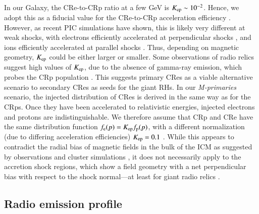 \documentclass[fleqn,usenatbib,useAMS]{mnras}
\begin{document}
In our Galaxy, the CRe-to-CRp ratio at a few GeV is $K_{{\mathrm{ep}}} \sim
10^{-2}$. Hence, we adopt this as a fiducial value for the CRe-to-CRp
acceleration efficiency \citep[see][for more
  discussion]{pinzke13}. However, as recent PIC simulations have
shown, this is likely very different at weak shocks, with electrons
efficiently accelerated at perpendicular shocks
\citep{2014ApJ...794..153G,2014ApJ...797...47G}, and ions efficiently
accelerated at parallel shocks \citep{2014ApJ...783...91C}. Thus,
depending on magnetic geometry, $K_{{\mathrm{ep}}}$ could be either larger
or smaller. Some observations of radio relics suggest high values of
$K_{{\mathrm{ep}}}$, due to the absence of gamma-ray emission, which probes
the CRp population \citep{2014MNRAS.437.2291V}. This suggests primary
CRes as a viable alternative scenario to secondary CRes as seeds for
the giant RHs. In our {\em M-primaries} scenario, the injected
distribution of CRes is derived in the same way as for the CRps. Once
they have been accelerated to relativistic energies, injected
electrons and protons are indistinguishable. We therefore assume that
CRp and CRe have the same distribution function $f_{\mathrm{e}}(p) =
K_{\mathrm{ep}} f_{\mathrm{p}}(p)$, with a different normalization (due to
differing acceleration efficiencies) $K_{\mathrm{ep}}=0.1$ \citep[which is
  viable for primarily perpendicular
  shocks,][]{2014ApJ...794..153G}. While this appears to contradict the
radial bias of magnetic fields in the bulk of the ICM as suggested by
observations \citep{2010NatPh...6..520P} and cluster simulations
\citep{2011ApJ...740...81R}, it does not necessarily apply to the
accretion shock regions, which show a field geometry with a net
perpendicular bias with respect to the shock normal---at least for
giant radio relics \citep{2010Sci...330..347V}.


\subsection{Radio emission profile}
\end{document}
